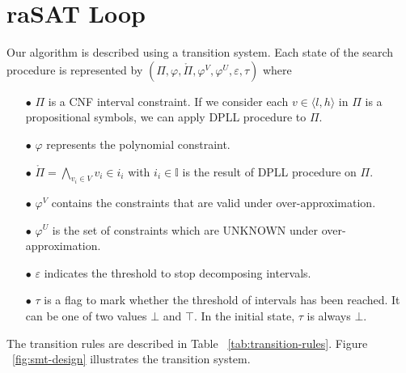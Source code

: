 \section{raSAT Loop} 
Our algorithm is described using a transition system. Each state of the search procedure is represented by $(\Pi, \varphi, \mathring{\Pi}, \varphi^V, \varphi^U, \varepsilon, \tau)$ where 
\begin{itemize}
\item[$\bullet$] $\Pi$ is a CNF interval constraint. If we consider each $v \in \langle l , h \rangle$ in $\Pi$ is a propositional symbols, we can apply DPLL procedure to $\Pi$.
\item[$\bullet$] $\varphi$ represents the polynomial constraint.
\item[$\bullet$] $\mathring{\Pi} = \bigwedge\limits_{v_i \in V} v_i \in i_i$ with $i_i \in \mathbb{I}$ is the result of DPLL procedure on $\Pi$.
\item[$\bullet$] $\varphi^V$ contains the constraints that are valid under over-approximation.
\item[$\bullet$] $\varphi^U$ is the set of constraints which are UNKNOWN under over-approximation.
\item[$\bullet$] $\varepsilon$ indicates the threshold to stop decomposing intervals.
\item[$\bullet$] $\tau$ is a flag to mark whether the threshold of intervals has been reached. It can be one of two values $\bot$ and $\top$. In the initial state, $\tau$ is always $\bot$.
\end{itemize}
The transition rules are described in Table ~\ref{tab:transition-rules}. Figure ~\ref{fig:smt-design} illustrates the transition system. 

